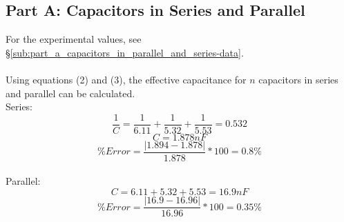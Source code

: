 \documentclass[titlepage]{article}
\begin{document}
\subsection{Part A: Capacitors in Series and Parallel}\label{sub:part_a_capacitors_in_series_and_parallel-analysis}
For the experimental values, see \S \ref{sub:part_a_capacitors_in_parallel_and_series-data}.\\
\\
Using equations (2) and (3), the effective capacitance for $n$ capacitors in series and parallel can be calculated.\\
Series:
\[
	\frac{1}{C} = \frac{1}{6.11} + \frac{1}{5.32} + \frac{1}{5.53} = 0.532
\]
\[
	C = 1.878 nF
\]
\[
	\% Error = \frac{|1.894 - 1.878|}{1.878} * 100 = 0.8 \%
\]
\\
Parallel:
\[
	C = 6.11 + 5.32 + 5.53 = 16.9 nF
\]
\[
	\% Error = \frac{|16.9 - 16.96|}{16.96} * 100 = 0.35 \%
\]
\end{document}
